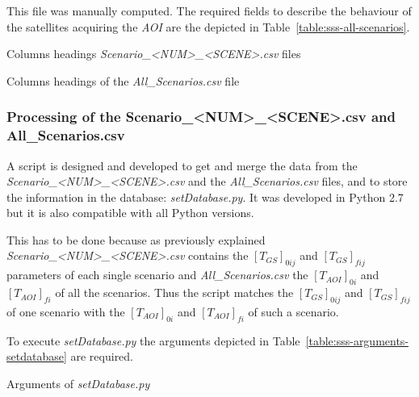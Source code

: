 \begin{itemize}
This file was manually computed. The required fields to describe the behaviour
of the satellites acquiring the \emph{AOI} are the depicted in Table~\ref{table:sss-all-scenarios}.

\begin{table}[h]
  \centering
  {\small
  
  }
  \caption{Columns headings \emph{Scenario\_<NUM>\_<SCENE>.csv} files}
  \label{table:sss-headings-scenario2}
\end{table}

\begin{table}[h]
  \centering
  {\small
  
  }
  \caption{Columns headings of the \emph{All\_Scenarios.csv} file}
  \label{table:sss-all-scenarios}
\end{table}
\end{itemize}


\subsubsection{Processing of the Scenario\_<NUM>\_<SCENE>.csv and
 All\_Scenarios.csv}
\label{subsubsec:processing-files}

A script is designed and developed to get and merge the data from the \emph{Scenario\_<NUM>\_<SCENE>.csv} and the \emph{All\_Scenarios.csv} files, and to store the information in the database:  \emph{setDatabase.py}. It was developed in Python 2.7 but it is also compatible with all Python versions.

This has to be done because as previously explained
\emph{Scenario\_<NUM>\_<SCENE>.csv} contains the $[T_{GS}]_{0ij}$ and $[T_{GS}]_{fij}$
parameters of each single scenario and \emph{All\_Scenarios.csv} the
$[T_{AOI}]_{0i}$ and $[T_{AOI}]_{fi}$ of all the scenarios. Thus the script matches the
$[T_{GS}]_{0ij}$ and $[T_{GS}]_{fij}$ of one scenario with the $[T_{AOI}]_{0i}$ and $[T_{AOI}]_{fi}$ of such a scenario.

To execute \emph{setDatabase.py} the arguments depicted in Table~\ref{table:sss-arguments-setdatabase} are required.
\begin{table}[h]
  \centering
  {\small
  
  }
  \caption{Arguments of \emph{setDatabase.py}}
  \label{table:sss-arguments-setdatabase}
\end{table}

